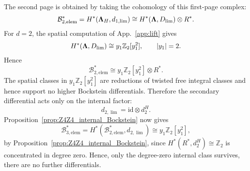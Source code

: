 \documentclass[aps,prx,reprint,superscriptaddress,twocolumn,amsmath,amssymb,amsfonts, nofootinbib]{revtex4-2}
\newcommand{\Z}{\mathbb{Z}}
\theoremstyle{apsstyle}
\begin{document}
The second page is obtained by taking the cohomology of this first-page complex: 
\begin{equation*} 
\mathcal B_{2,\mathrm{elem}}^{*} = H^{*}({\bf\Lambda}_{H},d_{1,\lim}) \cong H^{*}({\bf\Lambda},D_{\lim})\otimes R^{*}. 
\label{eq:Z4Z4_elementary_B2_general} 
\end{equation*} 
For $d=2$, the spatial computation of App.~\ref{app:lift} gives 
\begin{equation} 
H^{*}({\bf\Lambda},D_{\lim}) \cong y_1\mathbb Z_2[y_1^2], \qquad |y_1|=2. 
\label{eq:O2_primary_spatial_cohomology} 
\end{equation} 
Hence 
\begin{equation} 
\mathcal B_{2,\mathrm{elem}}^{*} \cong y_1\mathbb Z_2[y_1^2]\otimes R^{*}. 
\label{eq:Z4Z4_elementary_B2} 
\end{equation}
The spatial classes in $y_1\mathbb Z_2[y_1^2]$ are reductions of twisted free integral classes and hence support no higher Bockstein differentials. Therefore the secondary differential acts only on the internal factor: 
\begin{equation} 
d_{2,\lim} = \mathrm{id}\otimes d_2^{H}. 
\label{eq:Z4Z4_elementary_d2} 
\end{equation} 
Proposition~\ref{prop:Z4Z4_internal_Bockstein} now gives 
\begin{equation} 
\mathcal B_{3,\mathrm{elem}}^{*} = H^{*}(\mathcal B_{2,\mathrm{elem}}^{*}, d_{2,\lim}) \cong y_1\mathbb Z_2[y_1^2], 
\label{eq:Z4Z4_elementary_B3} 
\end{equation} 
by Proposition~\ref{prop:Z4Z4_internal_Bockstein}, since $H^{*}(R^{*},d_{2}^{H})\cong\Z_{2}$ is concentrated in degree zero. Hence, only the degree-zero internal class survives, there are no further differentials.
\end{document}
